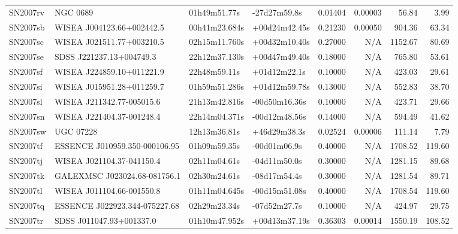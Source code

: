 \begin{longtable}{llllrrrr}
SN2007rv         &                        NGC 0689 &    01h49m51.77s &    -27d27m59.8s &  0.01404 &  0.00003 &    56.84 &        3.99 \\
SN2007sb         &       WISEA J004123.66+002442.5 &   00h41m23.684s &   +00d24m42.45s &  0.21230 &  0.00050 &   904.36 &       63.34 \\
SN2007sc         &       WISEA J021511.77+003210.5 &   02h15m11.760s &   +00d32m10.40s &  0.27000 &      N/A &  1152.67 &       80.69 \\
SN2007se         &        SDSS J221237.13+004749.3 &   22h12m37.130s &   +00d47m49.40s &  0.18000 &      N/A &   765.80 &       53.61 \\
SN2007sf         &       WISEA J224859.10+011221.9 &    22h48m59.11s &    +01d12m22.1s &  0.10000 &      N/A &   423.03 &       29.61 \\
SN2007si         &       WISEA J015951.28+011259.7 &   01h59m51.286s &   +01d12m59.78s &  0.13000 &      N/A &   552.83 &       38.70 \\
SN2007sl         &       WISEA J211342.77-005015.6 &   21h13m42.816s &   -00d50m16.36s &  0.10000 &      N/A &   423.71 &       29.66 \\
SN2007sn         &       WISEA J221404.37-001248.4 &   22h14m04.371s &   -00d12m48.56s &  0.14000 &      N/A &   594.49 &       41.62 \\
SN2007sw         &                       UGC 07228 &    12h13m36.81s &    +46d29m38.3s &  0.02524 &  0.00006 &   111.14 &        7.79 \\
SN2007tf         &  ESSENCE J010959.350-000106.95  &    01h09m59.35s &    -00d01m06.9s &  0.40000 &      N/A &  1708.52 &      119.60 \\
SN2007tj         &       WISEA J021104.37-041150.4 &    02h11m04.61s &    -04d11m50.0s &  0.30000 &      N/A &  1281.15 &       89.68 \\
SN2007tk         &  GALEXMSC J023024.68-081756.1   &    02h30m24.61s &    -08d17m54.4s &  0.30000 &      N/A &  1281.54 &       89.71 \\
SN2007tl         &       WISEA J011104.66-001550.8 &   01h11m04.645s &   -00d15m51.08s &  0.40000 &      N/A &  1708.54 &      119.60 \\
SN2007tq         &  ESSENCE J022923.344-075227.68  &    02h29m23.34s &    -07d52m27.7s &  0.10000 &      N/A &   424.97 &       29.75 \\
SN2007tr         &        SDSS J011047.93+001337.0 &   01h10m47.952s &   +00d13m37.19s &  0.36303 &  0.00014 &  1550.19 &      108.52 \\

\end{longtable}
